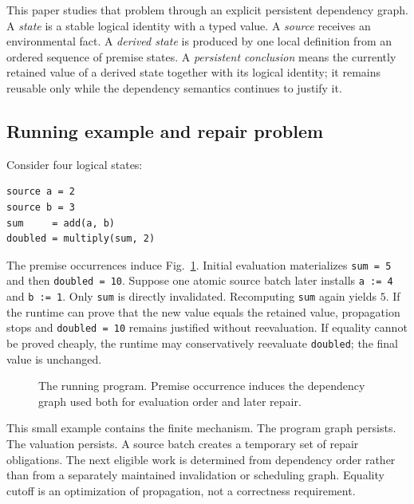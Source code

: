 This paper studies that problem through an explicit persistent dependency graph. A \emph{state} is a stable logical identity with a typed value. A \emph{source} receives an environmental fact. A \emph{derived state} is produced by one local definition from an ordered sequence of premise states. A \emph{persistent conclusion} means the currently retained value of a derived state together with its logical identity; it remains reusable only while the dependency semantics continues to justify it.

\subsection{Running example and repair problem}
Consider four logical states:
\begin{lstlisting}
source a = 2
source b = 3
sum     = add(a, b)
doubled = multiply(sum, 2)
\end{lstlisting}
The premise occurrences induce Fig.~\ref{fig:running}. Initial evaluation materializes \texttt{sum = 5} and then \texttt{doubled = 10}. Suppose one atomic source batch later installs \texttt{a := 4} and \texttt{b := 1}. Only \texttt{sum} is directly invalidated. Recomputing \texttt{sum} again yields $5$. If the runtime can prove that the new value equals the retained value, propagation stops and \texttt{doubled = 10} remains justified without reevaluation. If equality cannot be proved cheaply, the runtime may conservatively reevaluate \texttt{doubled}; the final value is unchanged.

\begin{figure}[t]
\centering
{}
\caption{The running program. Premise occurrence induces the dependency graph used both for evaluation order and later repair.}\label{fig:running}
\end{figure}

This small example contains the finite mechanism. The program graph persists. The valuation persists. A source batch creates a temporary set of repair obligations. The next eligible work is determined from dependency order rather than from a separately maintained invalidation or scheduling graph. Equality cutoff is an optimization of propagation, not a correctness requirement.

